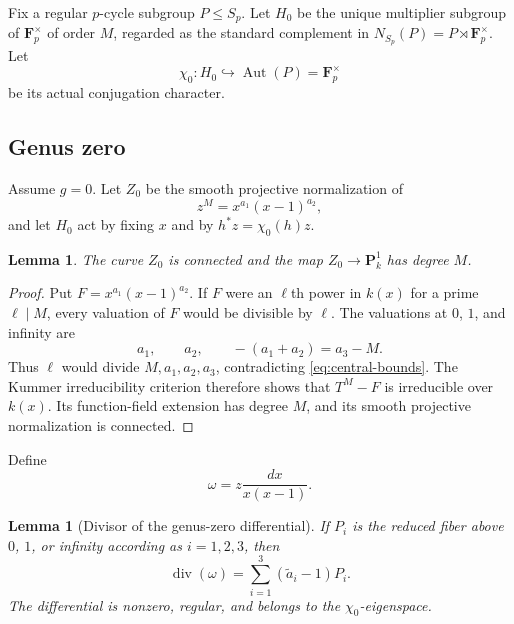 \documentclass[11pt]{amsart}
\theoremstyle{plain}
\newtheorem{lemma}[theorem]{Lemma}
\theoremstyle{definition}
\numberwithin{equation}{section}
\begin{document}
Fix a regular $p$-cycle subgroup $P\leq S_p$.  Let $H_0$ be the unique
multiplier subgroup of $\mathbf F_p^\times$ of order $M$, regarded as the
standard complement in
$N_{S_p}(P)=P\rtimes\mathbf F_p^\times$.  Let
\[
 \chi_0:H_0\hookrightarrow\operatorname{Aut}(P)=\mathbf F_p^\times
\]
be its actual conjugation character.

\subsection{Genus zero}
Assume $g=0$.  Let $Z_0$ be the smooth projective normalization of
\begin{equation}\label{eq:genus-zero-kummer}
 z^M=x^{a_1}(x-1)^{a_2},
\end{equation}
and let $H_0$ act by fixing $x$ and by
$h^*z=\chi_0(h)z$.

\begin{lemma}\label{lem:genus-zero-connected}
The curve $Z_0$ is connected and the map $Z_0\to\mathbf P^1_k$ has degree
$M$.
\end{lemma}

\begin{proof}
Put $F=x^{a_1}(x-1)^{a_2}$.  If $F$ were an $\ell$th power in $k(x)$ for a
prime $\ell\mid M$, every valuation of $F$ would be divisible by $\ell$.
The valuations at $0$, $1$, and infinity are
\[
 a_1,\qquad a_2,\qquad -(a_1+a_2)=a_3-M.
\]
Thus $\ell$ would divide $M,a_1,a_2,a_3$, contradicting
\eqref{eq:central-bounds}.  The Kummer irreducibility criterion therefore
shows that $T^M-F$ is irreducible over $k(x)$.  Its function-field extension
has degree $M$, and its smooth projective normalization is connected.
\end{proof}

Define
\begin{equation}\label{eq:genus-zero-form}
 \omega=z\frac{dx}{x(x-1)}.
\end{equation}

\begin{lemma}[Divisor of the genus-zero differential]
\label{lem:genus-zero-divisor}
If $P_i$ is the reduced fiber above $0$, $1$, or infinity according as
$i=1,2,3$, then
\[
 \operatorname{div}(\omega)
 =\sum_{i=1}^3(\widetilde a_i-1)P_i.
 \label{eq:genus-zero-divisor}
\]
The differential is nonzero, regular, and belongs to the
$\chi_0$-eigenspace.
\end{lemma}
\end{document}
